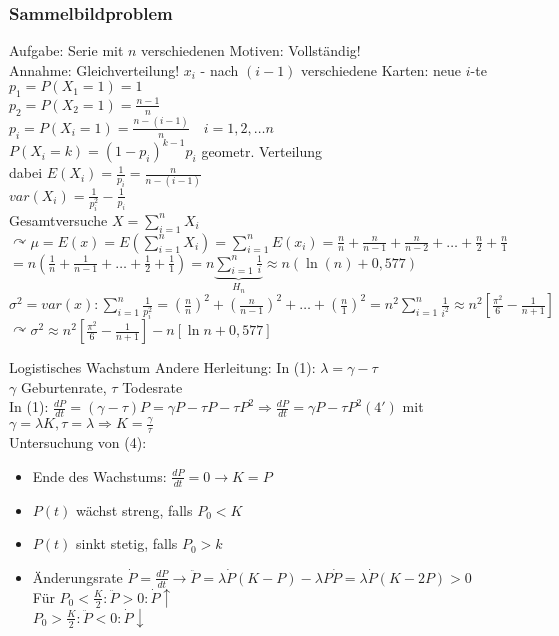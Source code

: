 \documentclass[a4paper]{scrartcl}
\begin{document}
\subsubsection{Sammelbildproblem}
Aufgabe: Serie mit $n$ verschiedenen Motiven: Vollständig!\\
Annahme: Gleichverteilung!
$x_i$ - nach $(i-1)$ verschiedene Karten: neue $i$-te \\
$p_1 = P(X_1 = 1) =1$\\
$p_2 = P(X_2=1)= \frac{n-1}{n} $\\
$p_i = P(X_i = 1) = \frac{n-(i-1)}{n}\quad i = 1,2,\dots n$\\
$P(X_i = k) = (1-p_i)^{k-1} p_i$ geometr. Verteilung\\
dabei $E(X_i) = \frac{1}{p_i} = \frac{n}{n-(i-1)}$\\
$var(X_i) = \frac{1}{p_i^2} -  \frac{1}{p_i}$\\
Gesamtversuche $X = \sum\limits_{i=1}^n X_i$\\
$\curvearrowright \mu = E(x) = E(\sum\limits_{i=1}^{n} X_i) = \sum\limits_{i=1}^n E(x_i) = \frac{n}{n} + \frac{n}{n-1} + \frac{n}{n-2} + \dots + \frac{n}{2} + \frac{n}{1}$\\
$= n( \frac{1}{n} + \frac{1}{n-1} + \dots + \frac{1}{2} + \frac{1}{1} ) = n \underbrace{\sum\limits_{i=1}^n \frac{1}{i}}_{H_n} \approx n (\ln{(n)} + 0,577)$\\
$\sigma^2 = var(x) : \sum\limits_{i=1}^n \frac{1}{p_i^2} = (\frac{n}{n})^2 + (\frac{n}{n-1})^2 + \dots + (\frac{n}{1})^2 = n^2 \sum\limits_{i=1}^n \frac{1}{i^2} \approx n^2 [ \frac{\pi^2}{6} - \frac{1}{n+1}]$\\
$\curvearrowright \sigma^2 \approx n^2 [ \frac{\pi^2}{6} - \frac{1}{n+1} ] - n [ \ln n + 0,577]$



Logistisches Wachstum
Andere Herleitung: In (1): $\lambda = \gamma - \tau$\\
$\gamma$ Geburtenrate, $\tau$ Todesrate\\
In (1): $\frac{dP}{dt} = (\gamma - \tau)P = \gamma P - \tau P - \tau P^2 \Rightarrow \frac{dP}{dt} = \gamma P - \tau P^2 (4')$ mit $\gamma = \lambda K, \tau = \lambda \Rightarrow K = \frac{\gamma}{\tau}$\\

Untersuchung von (4):
\begin{itemize}
\item Ende des Wachstums: $\frac{dP}{dt} = 0 \rightarrow K=P$
\item $P(t)$ wächst streng, falls $P_0 < K$
\item $P(t)$ sinkt stetig, falls $P_0 > k$
\item Änderungsrate $\dot{P} = \frac{dP}{dt} \rightarrow \ddot{P} = \lambda \dot{P} (K-P) - \lambda P\dot{P} = \lambda \dot{P} (K-2P) > 0$\\
Für $P_0 < \frac{K}{2} : \ddot{P} > 0 : \dot{P}\uparrow$\\
$P_0 > \frac{K}{2} : \ddot{P} < 0 : \dot{P} \downarrow$
\end{itemize}
\end{document}
